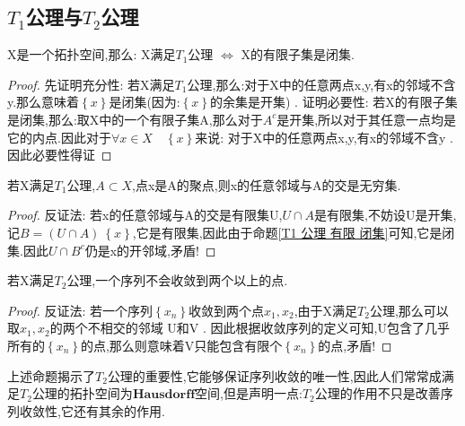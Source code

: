 \subsection*{\(T_1\)公理与\(T_2\)公理}
\begin{corollary}\label{T1 公理 有限 闭集}
    X是一个拓扑空间,那么: X满足\(T_1\)公理 \(\Leftrightarrow\) X的有限子集是闭集.
\end{corollary}
\begin{proof}
    先证明充分性: 
    若X满足\(T_1\)公理,那么:对于X中的任意两点x,y,有x的邻域不含y.那么意味着\(\left\{x\right\}\)是闭集(因为:\(\left\{x\right\}\)的余集是开集) .
    证明必要性:
    若X的有限子集是闭集,那么:取X中的一个有限子集A,那么对于\(A^{c}\)是开集,所以对于其任意一点均是它的内点.因此对于\(\forall x \in X \quad \left\{x\right\}\)来说: 对于X中的任意两点x,y,有x的邻域不含y .因此必要性得证
\end{proof}
\begin{lemma}
    若X满足\(T_1\)公理,\(A \subset X\),点x是A的聚点,则x的任意邻域与A的交是无穷集.
\end{lemma}
\begin{proof}
    反证法: 若x的任意邻域与A的交是有限集U,\(U \cap A\)是有限集,不妨设U是开集,记\(B=(U\cap A ) \ \left\{x\right\}\),它是有限集,因此由于命题\ref{T1 公理 有限 闭集}可知,它是闭集.因此\(U \cap B^{c}\)仍是x的开邻域,矛盾! 
\end{proof}
\begin{corollary}
    若X满足\(T_2\)公理,一个序列不会收敛到两个以上的点.
\end{corollary}
\begin{proof}
    反证法: 若一个序列\(\left\{x_n\right\}\)收敛到两个点\(x_1,x_2\),由于X满足\(T_2\)公理,那么可以取\(x_1,x_2\)的两个不相交的邻域 U和V . 因此根据收敛序列的定义可知,U包含了几乎所有的\(\left\{x_n\right\}\)的点,那么则意味着V只能包含有限个\(\left\{x_n\right\}\)的点,矛盾!
\end{proof}
上述命题揭示了\(T_2\)公理的重要性,它能够保证序列收敛的唯一性,因此人们常常成满足\(T_2\)公理的拓扑空间为\(\textbf{Hausdorff空间}\),但是声明一点:\(T_2\)公理的作用不只是改善序列收敛性,它还有其余的作用.
